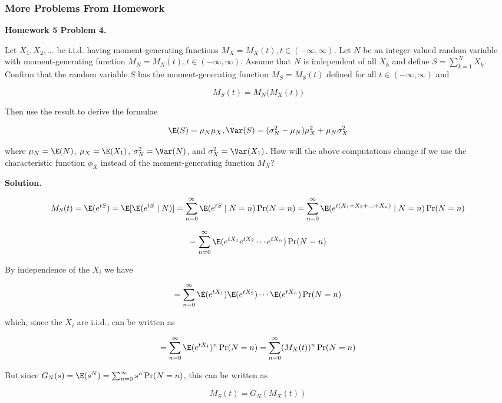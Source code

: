 %
%
%
%
%
%
%
%
%
%
\subsubsection{More Problems From Homework}


\textbf{Homework 5 Problem 4.}

Let \(X_1, X_2, \ldots\) be i.i.d. having moment-generating functions \(M_X = M_X(t), t \in (-\infty, \infty)\). Let \(N\) be an integer-valued random variable with moment-generating function \(M_N = M_N(t), t \in (-\infty, \infty)\). Assume that \(N\) is independent of all \(X_k\) and define \(S = \sum_{k=1}^N X_k\). Confirm that the random variable \(S\) has the moment-generating function \(M_S = M_S(t)\) defined for all \(t \in (-\infty, \infty)\) and 

\[
M_S(t) = M_N \big(M_X(t) \big)
\]

Then use the result to derive the formulae

\[
\E(S) = \mu_N \mu_X, \Var(S) = (\sigma_N^2  -\mu_N)\mu_X^2 + \mu_N \sigma_X^2
\]

where \(\mu_N = \E(N)\), \(\mu_X = \E(X_1)\), \(\sigma_N^2 = \Var(N)\), and \(\sigma_X^2 = \Var(X_1)\). How will the above computations change if we use the characteristic function \(\phi_X\) instead of the moment-generating function \(M_X\)? 

\textbf{Solution.}

\[
M_S(t) = \E(e^{tS}) = \E[ \E(e^{tS} \mid N)] =\sum_{n=0}^\infty \E(e^{tS} \mid N = n) \Pr(N = n) =\sum_{n=0}^\infty \E(e^{t(X_1 + X_2 + \ldots + X_n)} \mid N = n) \Pr(N = n)
\]

\[
=\sum_{n=0}^\infty \E(e^{tX_1} e^{tX_2}\cdots e^{t X_n} ) \Pr(N = n)
\]

By independence of the \(X_i\) we have

\[
=\sum_{n=0}^\infty \E(e^{tX_1}) \E( e^{tX_2})\cdots \E( e^{t X_n}) \Pr(N = n)
\]

which, since the \(X_i\) are i.i.d., can be written as

\[
=\sum_{n=0}^\infty \E(e^{tX_1})^n \Pr(N = n) =\sum_{n=0}^\infty (M_X(t))^n \Pr(N = n)
\]

But since \(G_N(s) = \E(s^N) = \sum_{n=0}^\infty s^n \Pr(N = n)\), this can be written as

\[
M_S(t) = G_N(M_X(t))
\]

